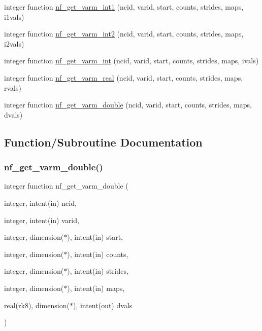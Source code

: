 \begin{DoxyCompactItemize}
integer function \hyperlink{nf__varmio_8F90_affd98434344ffcef76eb499e31ab2419}{nf\+\_\+get\+\_\+varm\+\_\+int1} (ncid, varid, start, counts, strides, maps, i1vals)
\item 
integer function \hyperlink{nf__varmio_8F90_aec08c30b85b865f26a55da47e1afc5e1}{nf\+\_\+get\+\_\+varm\+\_\+int2} (ncid, varid, start, counts, strides, maps, i2vals)
\item 
integer function \hyperlink{nf__varmio_8F90_a8ae5286478ed7650ccdd6a7835326b1e}{nf\+\_\+get\+\_\+varm\+\_\+int} (ncid, varid, start, counts, strides, maps, ivals)
\item 
integer function \hyperlink{nf__varmio_8F90_a0317452afd6ff0b14d3f2c98d47de670}{nf\+\_\+get\+\_\+varm\+\_\+real} (ncid, varid, start, counts, strides, maps, rvals)
\item 
integer function \hyperlink{nf__varmio_8F90_a7d44063e70aa8a03a202a220a4782870}{nf\+\_\+get\+\_\+varm\+\_\+double} (ncid, varid, start, counts, strides, maps, dvals)
\end{DoxyCompactItemize}


\subsection{Function/\+Subroutine Documentation}
\mbox{\label{nf__varmio_8F90_a7d44063e70aa8a03a202a220a4782870}} 
\subsubsection{\texorpdfstring{nf\+\_\+get\+\_\+varm\+\_\+double()}{nf\_get\_varm\_double()}}
{\footnotesize\ttfamily integer function nf\+\_\+get\+\_\+varm\+\_\+double (\begin{DoxyParamCaption}\item[{integer, intent(in)}]{ncid,  }\item[{integer, intent(in)}]{varid,  }\item[{integer, dimension($\ast$), intent(in)}]{start,  }\item[{integer, dimension($\ast$), intent(in)}]{counts,  }\item[{integer, dimension($\ast$), intent(in)}]{strides,  }\item[{integer, dimension($\ast$), intent(in)}]{maps,  }\item[{real(rk8), dimension($\ast$), intent(out)}]{dvals }\end{DoxyParamCaption})}



